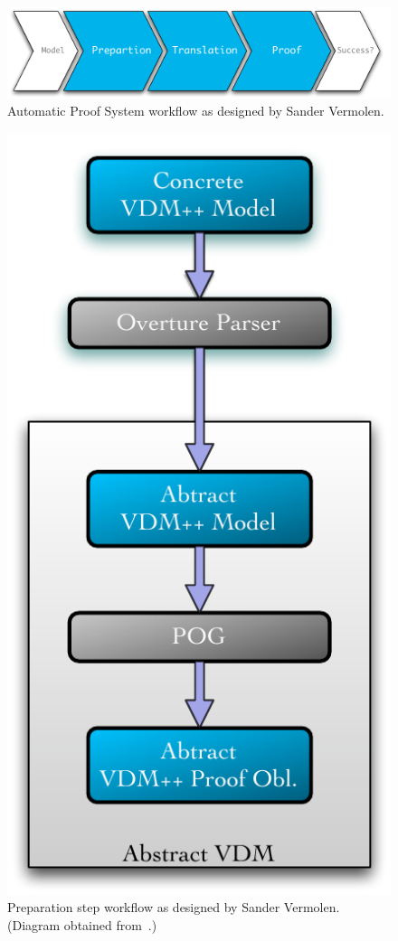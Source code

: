 \documentclass[]{article}
\begin{document}
\begin{figure}
  \begin{center}
    \includegraphics[width=.6\textwidth]{images/pic_arch.pdf}
    \caption[APS workflow]{Automatic Proof System workflow as designed by Sander Vermolen.}
    \label{fig:sander_arch}
  \end{center}
\end{figure}

\begin{figure}
  \begin{center}
  \includegraphics[height=.28\textheight]{images/pic_preparation.pdf}
  \caption[Preparation workflow]{Preparation step workflow as designed by Sander Vermolen. (Diagram obtained from~\cite{Vermolen07}.)}
  \label{fig:arch_preparation}
  \end{center}
\end{figure}
\end{document}
